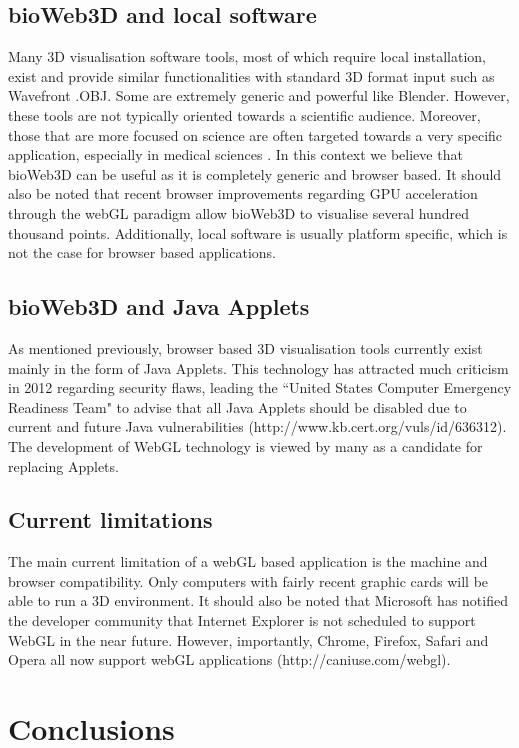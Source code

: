 \documentclass[10pt]{bmc_article}
\newenvironment{bmcformat}{\baselineskip20pt\sloppy\setboolean{publ}{false}}{\baselineskip20pt\sloppy}
\begin{document}
\begin{bmcformat}
	\subsection{bioWeb3D and local software}
Many 3D visualisation software tools, most of which require local installation, exist and provide similar functionalities with standard 3D format input such as Wavefront .OBJ. Some are extremely generic and powerful like Blender. However, these tools are not typically oriented towards a scientific audience. Moreover, those that are more focused on science are often targeted towards a very specific application, especially in medical sciences \cite{Wang09}. In this context we believe that bioWeb3D can be useful as it is completely generic and browser based. It should also be noted that recent browser improvements regarding GPU acceleration through the webGL paradigm allow bioWeb3D to visualise several hundred thousand points. Additionally, local software is usually platform specific, which is not the case for browser based applications.

	\subsection{bioWeb3D and Java Applets}
As mentioned previously, browser based 3D visualisation tools currently exist mainly in the form of Java Applets. This technology has attracted much criticism in 2012 regarding security flaws, leading the ``United States Computer Emergency Readiness Team" to advise that all Java Applets should be disabled due to current and future Java vulnerabilities (http://www.kb.cert.org/vuls/id/636312). The development of WebGL technology is viewed by many as a candidate for replacing Applets. 

	\subsection{Current limitations}
The main current limitation of a webGL based application is the machine and browser compatibility. Only computers with fairly recent graphic cards will be able to run a 3D environment. It should also be noted that Microsoft has notified the developer community that Internet Explorer is not scheduled to support WebGL in the near future. However, importantly, Chrome, Firefox, Safari and Opera all now support webGL applications (http://caniuse.com/webgl).

\section{Conclusions}


\end{bmcformat}
\end{document}
